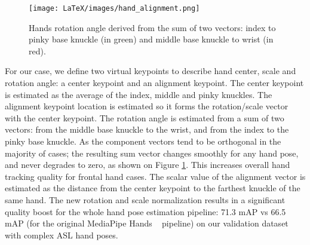 \documentclass[10pt,twocolumn,letterpaper]{article}
\begin{document}
\begin{figure}
\begin{center}
   \texttt{[image: LaTeX/images/hand\_alignment.png]}
\end{center}
   \caption{Hands rotation angle derived from the sum of two vectors: index to pinky base knuckle (in green) and middle base knuckle to wrist (in red).}
\label{fig:hand_alignment}
\end{figure}

For our case, we define two virtual keypoints to describe hand center, scale and rotation angle: a center keypoint and an alignment keypoint. The center keypoint is estimated as the average of the index, middle and pinky knuckles.
The alignment keypoint location is estimated so it forms the rotation/scale vector with the center keypoint. The rotation angle is estimated from a sum of two vectors: from the middle base knuckle to the wrist, and from the index to the pinky base knuckle. As the component vectors tend to be orthogonal in the majority of cases; the resulting sum vector changes smoothly for any hand pose, and never degrades to zero, as shown on Figure \ref{fig:hand_alignment}. This increases overall hand tracking quality for frontal hand cases. The scalar value of the alignment vector is estimated as the distance from the center keypoint to the farthest knuckle of the same hand. The new rotation and scale normalization results in a significant quality boost for the whole hand pose estimation pipeline: 71.3 mAP vs 66.5 mAP (for the original MediaPipe Hands ~\cite{mediapipe_hands} pipeline) on our validation dataset with complex ASL hand poses.
\end{document}
